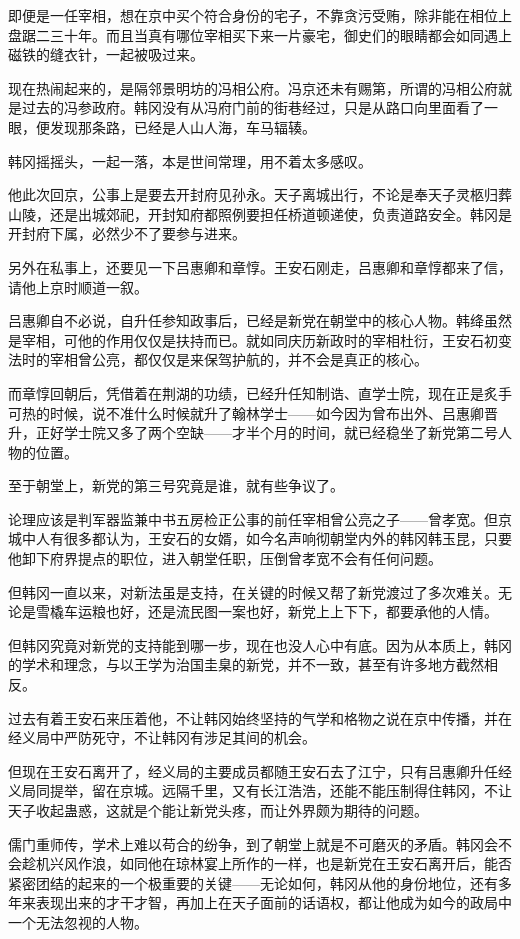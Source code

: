 即便是一任宰相，想在京中买个符合身份的宅子，不靠贪污受贿，除非能在相位上盘踞二三十年。而且当真有哪位宰相买下来一片豪宅，御史们的眼睛都会如同遇上磁铁的缝衣针，一起被吸过来。

现在热闹起来的，是隔邻景明坊的冯相公府。冯京还未有赐第，所谓的冯相公府就是过去的冯参政府。韩冈没有从冯府门前的街巷经过，只是从路口向里面看了一眼，便发现那条路，已经是人山人海，车马辐辏。

韩冈摇摇头，一起一落，本是世间常理，用不着太多感叹。

他此次回京，公事上是要去开封府见孙永。天子离城出行，不论是奉天子灵柩归葬山陵，还是出城郊祀，开封知府都照例要担任桥道顿递使，负责道路安全。韩冈是开封府下属，必然少不了要参与进来。

另外在私事上，还要见一下吕惠卿和章惇。王安石刚走，吕惠卿和章惇都来了信，请他上京时顺道一叙。

吕惠卿自不必说，自升任参知政事后，已经是新党在朝堂中的核心人物。韩绛虽然是宰相，可他的作用仅仅是扶持而已。就如同庆历新政时的宰相杜衍，王安石初变法时的宰相曾公亮，都仅仅是来保驾护航的，并不会是真正的核心。

而章惇回朝后，凭借着在荆湖的功绩，已经升任知制诰、直学士院，现在正是炙手可热的时候，说不准什么时候就升了翰林学士——如今因为曾布出外、吕惠卿晋升，正好学士院又多了两个空缺——才半个月的时间，就已经稳坐了新党第二号人物的位置。

至于朝堂上，新党的第三号究竟是谁，就有些争议了。

论理应该是判军器监兼中书五房检正公事的前任宰相曾公亮之子——曾孝宽。但京城中人有很多都认为，王安石的女婿，如今名声响彻朝堂内外的韩冈韩玉昆，只要他卸下府界提点的职位，进入朝堂任职，压倒曾孝宽不会有任何问题。

但韩冈一直以来，对新法虽是支持，在关键的时候又帮了新党渡过了多次难关。无论是雪橇车运粮也好，还是流民图一案也好，新党上上下下，都要承他的人情。

但韩冈究竟对新党的支持能到哪一步，现在也没人心中有底。因为从本质上，韩冈的学术和理念，与以王学为治国圭臬的新党，并不一致，甚至有许多地方截然相反。

过去有着王安石来压着他，不让韩冈始终坚持的气学和格物之说在京中传播，并在经义局中严防死守，不让韩冈有涉足其间的机会。

但现在王安石离开了，经义局的主要成员都随王安石去了江宁，只有吕惠卿升任经义局同提举，留在京城。远隔千里，又有长江浩浩，还能不能压制得住韩冈，不让天子收起蛊惑，这就是个能让新党头疼，而让外界颇为期待的问题。

儒门重师传，学术上难以苟合的纷争，到了朝堂上就是不可磨灭的矛盾。韩冈会不会趁机兴风作浪，如同他在琼林宴上所作的一样，也是新党在王安石离开后，能否紧密团结的起来的一个极重要的关键——无论如何，韩冈从他的身份地位，还有多年来表现出来的才干才智，再加上在天子面前的话语权，都让他成为如今的政局中一个无法忽视的人物。

